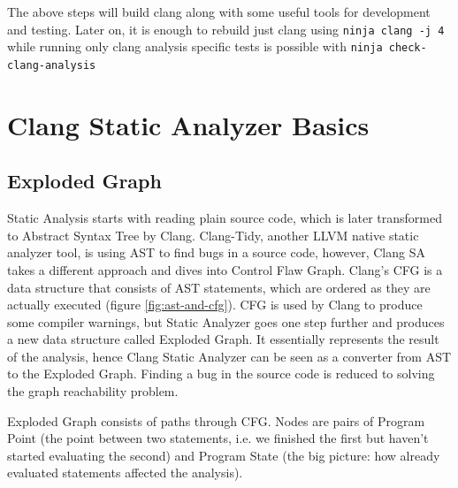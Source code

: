 The above steps will build clang along with some useful tools for development and testing. Later on, it is enough to rebuild just clang using \lstinline{ninja clang -j 4} while running only clang analysis specific tests is possible with \lstinline{ninja check-clang-analysis}


\section{Clang Static Analyzer Basics}
 
\subsection{Exploded Graph}
Static Analysis starts with reading plain source code, which is later transformed to Abstract Syntax Tree by Clang. Clang-Tidy, another LLVM native static analyzer tool, is using AST to find bugs in a source code, however, Clang SA takes a different approach and dives into Control Flaw Graph. Clang's CFG is a data structure that consists of AST statements, which are ordered as they are actually executed (figure \ref{fig:ast-and-cfg}). CFG is used by Clang to produce some compiler warnings, but Static Analyzer goes one step further and produces a new data structure called Exploded Graph. It essentially represents the result of the analysis, hence Clang Static Analyzer can be seen as a converter from AST to the Exploded Graph. Finding a bug in the source code is reduced to solving the graph reachability problem.

Exploded Graph consists of paths through CFG. Nodes are pairs of Program Point (the point between two statements, i.e. we finished the first but haven't started evaluating the second) and Program State (the big picture: how already evaluated statements affected the analysis).


